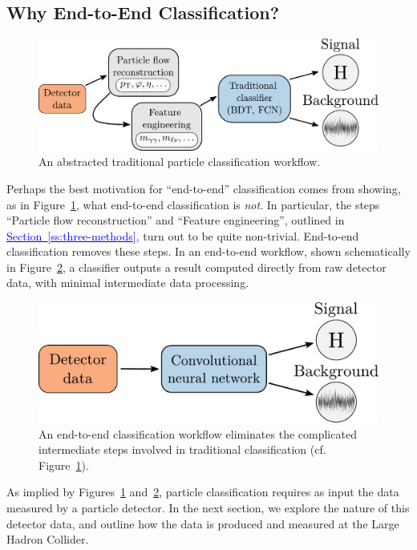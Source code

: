 \documentclass[11pt, a4paper]{article}
\newcommand{\myhref}[2]{\hyperref[#1]{\textcolor{blue}{#2}}}
\begin{document}
\subsection{Why End-to-End Classification?}

\begin{figure}[htb!]
        \centering
        \includegraphics[width=0.8\linewidth]{vector/traditional-pipeline.pdf}
        \caption{An abstracted traditional particle classification workflow.}
        \label{fig:traditional-pipeline}
\end{figure}

Perhaps the best motivation for ``end-to-end'' classification comes from showing, as in Figure~\ref{fig:traditional-pipeline}, what end-to-end classification is \textit{not}.
In particular, the steps ``Particle flow reconstruction'' and ``Feature engineering'', outlined in \myhref{ss:three-methods}{Section~\ref{ss:three-methods}}, turn out to be quite non-trivial.
End-to-end classification removes these steps.
In an end-to-end workflow, shown schematically in Figure~\ref{fig:cnn-pipeline}, a classifier outputs a result computed directly from raw detector data, with minimal intermediate data processing.

\begin{figure}[htb!]
    \centering
    \includegraphics[width=0.70\linewidth]{vector/cnn-pipeline.pdf}
    \caption{An end-to-end classification workflow eliminates the complicated intermediate steps involved in traditional classification (cf. Figure~\ref{fig:traditional-pipeline}).}
    \label{fig:cnn-pipeline}
\end{figure}

 As implied by Figures~\ref{fig:traditional-pipeline} and~\ref{fig:cnn-pipeline}, particle classification requires as input the data measured by a particle detector.
 In the next section, we explore the nature of this detector data, and outline how the data is produced and measured at the Large Hadron Collider.
\end{document}

